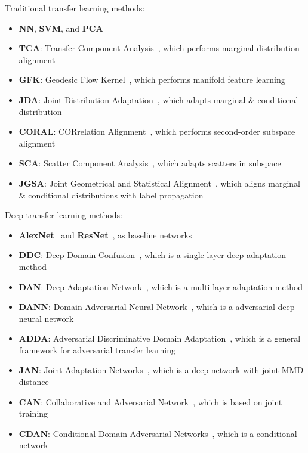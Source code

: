 \documentclass[acmsmall]{acmart}
\begin{document}
Traditional transfer learning methods:

\begin{itemize}[noitemsep]
	\item \textbf{NN}, \textbf{SVM}, and \textbf{PCA}
	\item \textbf{TCA}: Transfer Component Analysis~\cite{pan2011domain}, which performs marginal distribution alignment
	\item \textbf{GFK}: Geodesic Flow Kernel~\cite{gong2012geodesic}, which performs manifold feature learning
	\item \textbf{JDA}: Joint Distribution Adaptation~\cite{long2013transfer}, which adapts marginal \& conditional distribution
	\item \textbf{CORAL}: CORrelation Alignment~\cite{sun2016return}, which performs second-order subspace alignment
	\item \textbf{SCA}: Scatter Component Analysis~\cite{ghifary2017scatter}, which adapts scatters in subspace
	\item \textbf{JGSA}: Joint Geometrical and Statistical Alignment~\cite{zhang2017joint}, which aligns marginal \& conditional distributions with label propagation
\end{itemize}

Deep transfer learning methods:

\begin{itemize}[noitemsep]
	\item \textbf{AlexNet}~\cite{krizhevsky2012imagenet} and \textbf{ResNet}~\cite{he2016deep}, as baseline networks
	\item \textbf{DDC}: Deep Domain Confusion~\cite{tzeng2014deep}, which is a single-layer deep adaptation method
	\item \textbf{DAN}: Deep Adaptation Network~\cite{long2015learning}, which is a multi-layer adaptation method
	\item \textbf{DANN}: Domain Adversarial Neural Network~\cite{ganin2014unsupervised}, which is a adversarial deep neural network
	\item \textbf{ADDA}: Adversarial Discriminative Domain Adaptation~\cite{tzeng2017adversarial}, which is a general framework for adversarial transfer learning
	\item \textbf{JAN}: Joint Adaptation Networks~\cite{long2017deep}, which is a deep network with joint MMD distance
	\item \textbf{CAN}: Collaborative and Adversarial Network~\cite{zhang2018collaborative}, which is based on joint training
	\item \textbf{CDAN}: Conditional Domain Adversarial Networks~\cite{long2018conditional}, which is a conditional network
\end{itemize}
\end{document}
